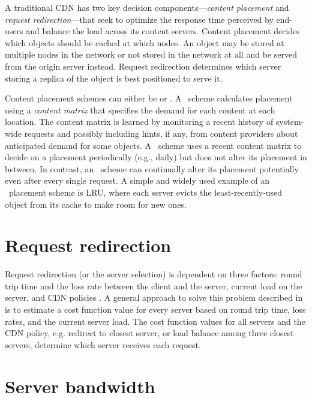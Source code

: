 A traditional CDN has two key decision components---{\em content placement} and {\em request redirection}---that seek to optimize the response time perceived by end-users and balance the load across its content servers. Content placement decides which objects should be cached at which nodes. An object may be stored at multiple nodes in the network or not stored in the network at all and be served from the origin server instead. Request redirection determines which server storing a replica of the object is best positioned to serve it.

Content placement schemes can either be {\em \planned} or {\em \unplanned}. A \planned\ scheme calculates placement using a {\em content matrix} that specifies the demand for each content at each location. The content matrix is learned by monitoring a recent history of system-wide requests and possibly including hints, if any, from content providers about anticipated demand for some objects. A \planned\ scheme uses a recent content matrix to decide on a placement periodically (e.g., daily) but does not alter its placement in between. In contrast, an \unplanned\ scheme can continually alter its placement potentially even after every single request. A simple and widely used example of an \unplanned\ placement scheme is LRU, where each server evicts the least-recently-used object from its cache to make room for new ones.


\section{Request redirection}

Request redirection (or the server selection) is dependent on three factors:  round trip time and the loss rate between the client and the server, current load on the server, and CDN policies \cite{donar,DilleyMPPSW02,oasis}.  A general approach to solve this problem described in \cite{donar} is to estimate a cost function value for  every server based on  round trip time, loss rates, and the current server load.  
The cost function values for all servers and  the CDN policy, e.g. redirect to closest server, or load balance among three closest servers,  determine which server receives each request.


\section{Server bandwidth}

